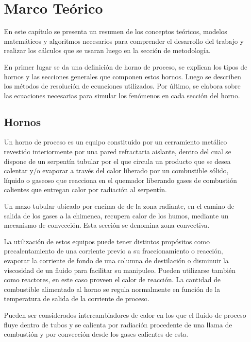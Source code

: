 \chapter{Marco Teórico}

\par En este capítulo se presenta un resumen de los conceptos teóricos, modelos matemáticos y algoritmos necesarios para comprender el desarrollo del trabajo y realizar los cálculos que se usaran luego en la sección de metodología.

\par En primer lugar se da una definición de horno de proceso, se explican los tipos de hornos y las secciones generales que componen estos hornos. Luego se describen los métodos de resolución de ecuaciones utilizados. Por último, se elabora sobre las ecuaciones necesarias para simular los fenómenos en cada sección del horno.

\section{Hornos}

\par Un horno de proceso es un equipo constituido por un cerramiento metálico revestido interiormente por una pared refractaria aislante, dentro del cual se dispone de un serpentín tubular por el que circula un producto que se desea calentar y/o evaporar a través del calor liberado por un combustible sólido, líquido o gaseoso que reacciona en el quemador liberando gases de combustión calientes que entregan calor por radiación al serpentín.

\par Un mazo tubular ubicado por encima de de la zona radiante, en el camino de salida de los gases a la chimenea, recupera calor de los humos, mediante un mecanismo de convección. Esta sección se denomina zona convectiva.

\par La utilización de estos equipos puede tener distintos propósitos como precalentamiento de una corriente previo a su fraccionamiento o reacción, evaporar la corriente de fondo de una columna de destilación o disminuir la viscosidad de un fluido para facilitar su manipuleo.
Pueden utilizarse también como reactores, en este caso proveen el calor de reacción. La cantidad de combustible alimentado al horno se regula normalmente en función de la temperatura de salida de la corriente de proceso.

\par Pueden ser considerados intercambiadores de calor en los que el fluido de proceso fluye dentro de tubos y se calienta por radiación procedente de una llama de combustión y por convección desde los gases calientes de esta.

